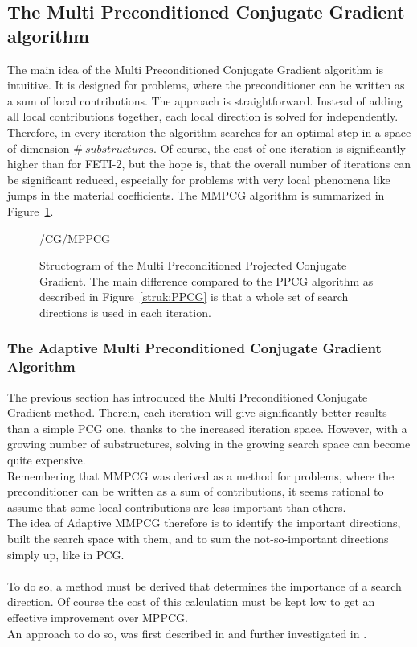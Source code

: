 \subsection{The Multi Preconditioned Conjugate Gradient algorithm}\label{sec:mpcg}
The main idea of the Multi Preconditioned Conjugate Gradient algorithm is intuitive. It is designed for problems, where the preconditioner can be written as a sum of local contributions. The approach is straightforward. Instead of adding all local contributions together, each local direction is solved for independently. Therefore, in every iteration the algorithm searches for an optimal step in a space of dimension $\#~substructures$. Of course, the cost of one iteration is significantly higher than for FETI-2, but the hope is, that the overall number of iterations can be significant reduced, especially for problems with very local phenomena like jumps in the material coefficients. The MMPCG algorithm is summarized in Figure~\ref{struk:MPPCG}.

\begin{figure}[h!]
	\centering
        {\tikzpath/CG/MPPCG}
        \caption[Structogram Multi Preconditioned Projected Conjugate Gradient]{Structogram of the Multi Preconditioned Projected Conjugate Gradient. The main difference compared to the PPCG algorithm as described in Figure~\ref{struk:PPCG} is that a whole set of search directions is used in each iteration. }
		\label{struk:MPPCG}
\end{figure}


\subsubsection{The Adaptive Multi Preconditioned Conjugate Gradient Algorithm}\label{sec:ampcg}
The previous section has introduced the Multi Preconditioned Conjugate Gradient method. Therein, each iteration will give significantly better results than a simple PCG one, thanks to the increased iteration space. However, with a growing number of substructures, solving in the growing search space can become quite expensive.\\
Remembering that MMPCG was derived as a method for problems, where the preconditioner can be written as a sum of contributions, it seems rational to assume that some local contributions are less important than others.\\
The idea of Adaptive MMPCG therefore is to identify the important directions, built the search space with them, and to sum the not-so-important directions simply up, like in PCG.\\
\\
To do so, a method must be derived that determines the importance of a search direction. Of course the cost of this calculation must be kept low to get an effective improvement over MPPCG.\\
An approach to do so, was first described in \cite{Spillane2013} and further investigated in \cite{Spillane2016}.\\


